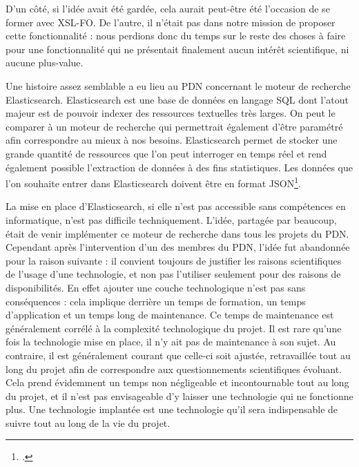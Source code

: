 \documentclass[a4paper,12pt,twoside]{book}
\begin{document}
D'un côté, si l'idée avait été gardée, cela aurait peut-être été l'occasion de se former avec \acrshort{XSL-FO}. De l'autre, il n'était pas dans notre mission de proposer cette fonctionnalité : nous perdions donc du temps sur le reste des choses à faire pour une fonctionnalité qui ne présentait finalement aucun intérêt scientifique, ni aucune plus-value.

Une histoire assez semblable a eu lieu au \acrshort{PDN} concernant le moteur de recherche Elasticsearch. Elasticsearch est une base de données en langage SQL dont l'atout majeur est de pouvoir indexer des ressources textuelles très larges. On peut le comparer à un moteur de recherche qui permettrait également d'être paramétré afin correspondre au mieux à nos besoins. Elasticsearch permet de stocker une grande quantité de ressources que l'on peut interroger en temps réel et rend également possible l'extraction de données à des fins statistiques. Les données que l'on souhaite entrer dans Elasticsearch doivent être en format \acrshort{JSON}\footcite{elastic}. 

La mise en place d'Elasticsearch, si elle n'est pas accessible sans compétences en informatique, n'est pas difficile techniquement. L'idée, partagée par beaucoup, était de venir implémenter ce moteur de recherche dans tous les projets du \acrshort{PDN}. Cependant après l'intervention d'un des membres du \acrshort{PDN}, l'idée fut abandonnée pour la raison suivante : il convient toujours de justifier les raisons scientifiques de l'usage d'une technologie, et non pas l'utiliser seulement pour des raisons de disponibilités. En effet ajouter une couche technologique n'est pas sans conséquences : cela implique derrière un temps de formation, un temps d'application et un temps long de maintenance. Ce temps de maintenance est généralement corrélé à la complexité technologique du projet. Il est rare qu'une fois la technologie mise en place, il n'y ait pas de maintenance à son sujet. Au contraire, il est généralement courant que celle-ci soit ajustée, retravaillée tout au long du projet afin de correspondre aux questionnements scientifiques évoluant. Cela prend évidemment un temps non négligeable et incontournable tout au long du projet, et il n'est pas envisageable d'y laisser une technologie qui ne fonctionne plus. Une technologie implantée est une technologie qu'il sera indispensable de suivre tout au long de la vie du projet. 
\end{document}
